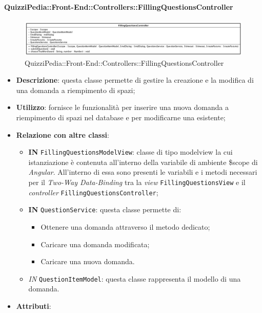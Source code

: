 \paragraph{QuizziPedia::Front-End::Controllers::FillingQuestionsController}
\begin{figure} [ht]
	\centering
	\includegraphics[scale=0.38]{UML/Classi/Front-End/QuizziPedia_Front-end_Controller_FillingQuestionsController.png}
	\caption{QuizziPedia::Front-End::Controllers::FillingQuestionsController}
\end{figure} \FloatBarrier
\begin{itemize}
	\item \textbf{Descrizione}: questa classe permette di gestire la creazione e la modifica di una domanda a riempimento di spazi;
	\item \textbf{Utilizzo}: fornisce le funzionalità per inserire una nuova domanda a riempimento di spazi nel database e per modificarne una esistente;
	\item \textbf{Relazione con altre classi}:
	\begin{itemize}
		\item \textbf{IN} \texttt{FillingQuestionsModelView}: classe di tipo modelview la cui istanziazione è contenuta all'interno della variabile di ambiente \$scope di \textit{Angular}. All'interno di essa sono presenti le variabili e i metodi necessari per il \textit{Two-Way Data-Binding} tra la \textit{view} \texttt{FillingQuestionsView} e il \textit{controller} \texttt{FillingQuestionsController};
		\item \textbf{IN} \texttt{QuestionService}: questa classe permette di:
		\begin{itemize}
			\item Ottenere una domanda attraverso il metodo dedicato;
			\item Caricare una domanda modificata;
			\item Caricare una nuova domanda.
		\end{itemize}
		\item \textit{IN} \texttt{QuestionItemModel}: questa classe rappresenta il modello di una domanda.
	\end{itemize}
	\item \textbf{Attributi}:
	\begin{itemize}

\end{itemize}
\end{itemize}
